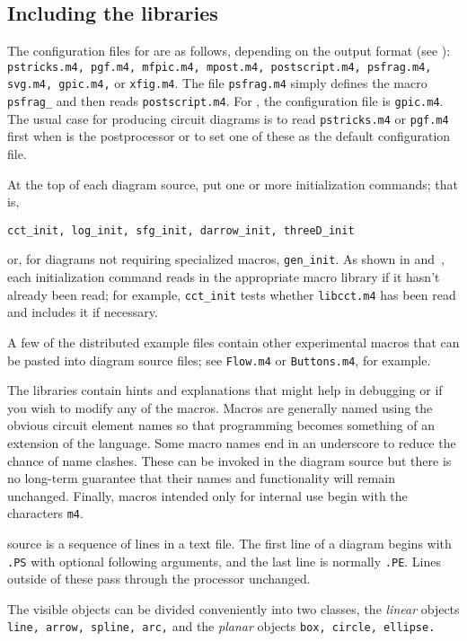 \subsection{Including the libraries\label{Libraries:}}
The configuration files for \dpic are as follows,
depending on the output format (see ):
{\tt pstricks.m4, pgf.m4, mfpic.m4, mpost.m4, postscript.m4, psfrag.m4, svg.m4,
 gpic.m4,} or {\tt xfig.m4}.
The file {\tt psfrag.m4} simply defines the macro {\tt psfrag\_} and
then reads {\tt postscript.m4}.
For \gpic, the configuration file is {\tt gpic.m4}.
The usual case for producing circuit diagrams is to read
{\tt pstricks.m4} or {\tt pgf.m4} first when \dpic is the postprocessor or
to set one of these as the default configuration file.

At the top of each diagram source, put one or more initialization
commands; that is,

{\tt cct\_init, log\_init, sfg\_init, darrow\_init, threeD\_init}

\noindent
or, for diagrams not requiring specialized macros, {\tt gen\_init}.
As shown in  and~,
each initialization command reads in the appropriate macro
library if it hasn't already been read;
for example, {\tt cct\_init} tests whether {\tt libcct.m4} has been
read and includes it if necessary.

A few of the distributed example files contain other experimental macros
that can be pasted into diagram source files; see
{\tt Flow.m4} or {\tt Buttons.m4}, for example.

The libraries contain hints and explanations that might help in debugging
or if you wish to modify any of the macros.  Macros are generally named
using the obvious circuit element names so that programming becomes something
of an extension of the \pic language.  Some macro names end in an underscore
to reduce the chance of name clashes.  These can be invoked in the
diagram source but there is no long-term guarantee that their names and
functionality
will remain unchanged. Finally, macros intended only for internal use
begin with the characters {\tt m4}.


\Pic source is a sequence of lines in a text file.
The first line of a diagram begins with {\tt .PS} with optional following
arguments, and the last line is normally {\tt .PE}.
Lines outside of these pass through the \pic processor unchanged.

The visible objects can be divided conveniently into two classes, the
{\em linear} objects {\tt line, arrow, spline, arc,} and the
{\em planar} objects {\tt box, circle, ellipse.}

